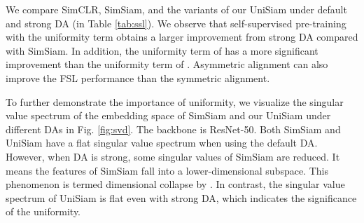 \documentclass[runningheads]{llncs}
\begin{document}
\begin{table}[tbp]
 \centering
    \caption{\textbf{Comparison of self-supervised methods under default and strong data augmentations.} We report their 5-way 5-shot accuracy (\%) on \emph{mini}-ImageNet. ``symm.'' and ``asymm.'' denote using the symmetric alignment (Eq. \ref{eq:loss_nce} or Eq. \ref{eq:loss_mine}) and the asymmetric alignment (Eq. \ref{eq:loss_amine}) respectively.}
    \label{tab:ssl}
\end{table}



We compare SimCLR, SimSiam, and the variants of our UniSiam under default and strong DA (in Table \ref{tab:ssl}).
We observe that self-supervised pre-training with the uniformity term obtains a larger improvement from strong DA compared with SimSiam.
In addition, the uniformity term of  has a more significant improvement than the uniformity term of . 
Asymmetric alignment can also improve the FSL performance than the symmetric alignment.



To further demonstrate the importance of uniformity, we visualize the singular value spectrum of the embedding space of SimSiam and our UniSiam under different DAs in Fig. \ref{fig:svd}. 
The backbone is ResNet-50.
Both SimSiam and UniSiam have a flat singular value spectrum when using the default DA.
However, when DA is strong, some singular values of SimSiam are reduced.
It means the features of SimSiam fall into a lower-dimensional subspace.
This phenomenon is termed dimensional collapse by \cite{Jing2021UnderstandingDC}.
In contrast, the singular value spectrum of UniSiam is flat even with strong DA, which indicates the significance of the uniformity.
\end{document}
